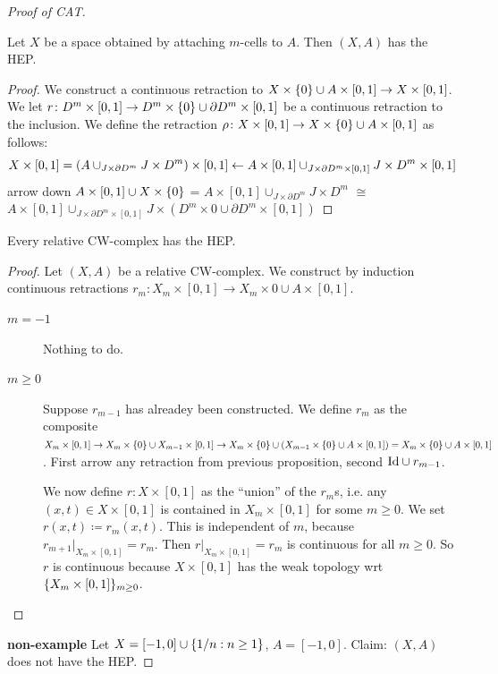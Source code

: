 \documentclass{TemplateLecture}
\begin{document}
\begin{proof}[Proof of CAT]
    \begin{proposition}
        Let \(X\) be a space obtained by attaching \(m\)-cells to \(A\). Then \((X,A)\) has the HEP.
    \end{proposition}
    \begin{proof}
        We construct a continuous retraction to \(X\times \{0\} \cup A \times [0,1] \to X\times [0,1]\). We let \(r \colon D^m \times [0,1] \to D^m \times \{0\} \cup \partial D^m \times [0,1]\) be a continuous retraction to the inclusion.
        We define the retraction \(\rho\colon X \times [0,1] \to X \times \{0\} \cup A \times [0,1]\) as follows:
        \[X\times [0,1] = (A \cup_{J\times \partial D^m} J\times D^m) \times [0,1] \leftarrow A \times [0,1] \cup_{J\times \partial D^m \times [0,1]} J\times D^m \times [0,1]\]%
                arrow down
        \(A\times [0,1] \cup X\times \{0\}\) = \(A \times [0,1] \cup_{J\times \partial D^m} J\times D^m\) \(\cong\) \(A\times [0,1] \cup_{J\times \partial D^m \times [0,1]} J\times (D^m \times 0 \cup \partial D^m \times [0,1])\)
    \end{proof}

    \begin{thm}{}{}
        Every relative CW-complex has the HEP.
    \end{thm}
    \begin{proof}
        Let \((X,A)\) be a relative CW-complex. We construct by induction continuous retractions \(r_m\colon X_m \times [0,1] \to X_m \times 0 \cup A\times [0,1]\).
        \begin{description}
            \item[\(m = -1\)] Nothing to do.
            \item[\(m \geq 0\)] Suppose \(r_{m-1}\) has alreadey been constructed. We define \(r_m\) as the composite \(X_m \times [0,1] \to X_m \times \{0\} \cup X_{m-1} \times [0,1] \to X_m \times \{0\} \cup (X_{m-1} \times \{0\} \cup A \times [0,1]) = X_m \times \{0\} \cup A \times [0,1]\). First arrow any retraction from previous proposition, second \(\mathrm{Id} \cup r_{m-1}\).
            
            We now define \(r\colon X\times [0,1]\) as the \enquote{union} of the \(r_m\)s, i.e. any \((x,t) \in X\times [0,1]\) is contained in \(X_m \times [0,1]\) for some \(m \geq 0\). We set \(r(x,t) \coloneq r_m(x,t)\). This is independent of \(m\), because \(r_{m+1}\rvert_{X_m\times [0,1]} = r_m\). Then \(r\rvert_{X_m \times [0,1]} = r_m\) is continuous for all \(m \geq 0\). So \(r\) is continuous because \(X \times [0,1]\) has the weak topology wrt \(\{X_m \times [0,1]\}_{m \geq 0}\).
        \end{description}
    \end{proof}
    \textbf{non-example} Let \(X = [-1,0] \cup \{1/n : n \geq 1\}\), \(A = [-1, 0]\). Claim: \((X,A)\) does not have the HEP.


\end{proof}
\end{document}
